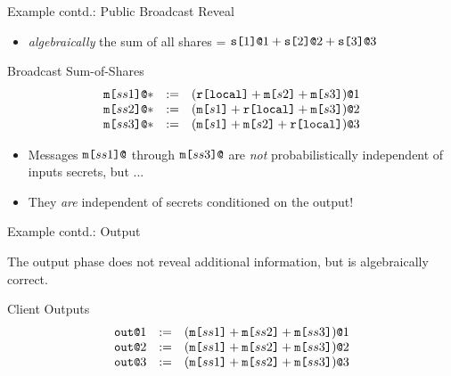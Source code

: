 \documentclass{beamer}
\begin{document}
\begin{frame}{Example contd.: Public Broadcast Reveal}

  \begin{itemize}
   \item \emph{algebraically} the sum of all shares = $\texttt{s[}1\texttt{]}\texttt{@}1 + \texttt{s[}2\texttt{]}\texttt{@}2 + \texttt{s[}3\texttt{]}\texttt{@}3$    
  \end{itemize}

  \begin{block}{Broadcast Sum-of-Shares}
    $$
    \begin{array}{lll}
      \texttt{m[}ss1\texttt{]}\texttt{@}* &:=& (\texttt{r[}\mathtt{local}\texttt{]} + \texttt{m[}s2\texttt{]} + \texttt{m[}s3\texttt{]})\texttt{@}1 \\ 
      \texttt{m[}ss2\texttt{]}\texttt{@}* &:=& (\texttt{m[}s1\texttt{]} + \texttt{r[}\mathtt{local}\texttt{]} + \texttt{m[}s3\texttt{]})\texttt{@}2 \\
      \texttt{m[}ss3\texttt{]}\texttt{@}* &:=& (\texttt{m[}s1\texttt{]} + \texttt{m[}s2\texttt{]} + \texttt{r[}\mathtt{local}\texttt{]})\texttt{@}3 
    \end{array}
    $$
  \end{block}

  \begin{itemize}
  \item Messages $\mx{ss1}$ through $\mx{ss3}$ are \emph{not} probabilistically independent of inputs
    secrets, but ...
  \item They \emph{are} independent of secrets conditioned on the output!
  \end{itemize}
  
\end{frame}

\begin{frame}{Example contd.: Output}

  The output phase does not reveal additional information, but is
  algebraically correct.
  \begin{block}{Client Outputs}
    $$
    \begin{array}{lll}
      \texttt{out}\texttt{@}1 &:=& (\texttt{m[}ss1\texttt{]} + \texttt{m[}ss2\texttt{]} + \texttt{m[}ss3\texttt{]})\texttt{@}1\\
      \texttt{out}\texttt{@}2 &:=& (\texttt{m[}ss1\texttt{]} + \texttt{m[}ss2\texttt{]} + \texttt{m[}ss3\texttt{]})\texttt{@}2\\
      \texttt{out}\texttt{@}3 &:=& (\texttt{m[}ss1\texttt{]} + \texttt{m[}ss2\texttt{]} + \texttt{m[}ss3\texttt{]})\texttt{@}3
    \end{array}
    $$
  \end{block}
  
  
\end{frame}
\end{document}
